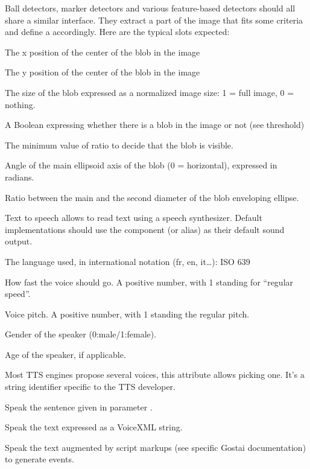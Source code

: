 
Ball detectors, marker detectors and various feature-based detectors
should all share a similar interface. They extract a part of the image
that fits some criteria and define a  accordingly. Here are
the typical slots expected:

\begin{slots}
  {%
    The x position of the center of the blob in the image%
  }

  {%
    The y position of the center of the blob in the image%
  }

  {%
    The size of the blob expressed as a normalized image size: 1 =
    full image, 0 = nothing.%
  }

  {%
    A Boolean expressing whether there is a blob in the image or not
    (see threshold)%
  }

  {%
    The minimum value of ratio to decide that the blob is visible.%
  }

  {%
    Angle of the main ellipsoid axis of the blob (0 = horizontal),
    expressed in radians.%
  }

  {%
    Ratio between the main and the second diameter of the blob
    enveloping ellipse.%
  }

\end{slots}

Text to speech allows to read text using a speech synthesizer. Default
implementations should use the  component (or alias) as
their default sound output.

\begin{slots}
  {%
    The language used, in international notation (fr, en, it…): ISO
    639%
  }

  {%
    How fast the voice should go.  A positive number, with 1 standing
    for ``regular speed''.
  }

  {%
    Voice pitch.  A positive number, with 1 standing the regular pitch.%
  }

  {%
    Gender of the speaker (0:male/1:female).%
  }

  {%
    Age of the speaker, if applicable.%
  }

  {%
    Most TTS engines propose several voices, this attribute
    allows picking one. It's a string identifier specific to the TTS
    developer.%
  }

  {%
    Speak the sentence given in parameter .%
  }

  {%
    Speak the text  expressed as a VoiceXML string.%
  }

  {%
    Speak the text  augmented by script markups (see specific
    Gostai documentation) to generate \urbi events.%
  }

\end{slots}


